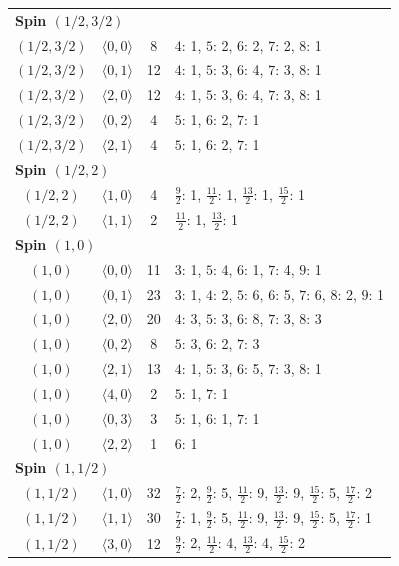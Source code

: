 \begin{longtable}{c c c p{8.8cm}}
\midrule
\multicolumn{4}{l}{\textbf{Spin $(1/2,3/2)$}}\\
$(1/2,3/2)$ & $\langle 0,0\rangle$ & 8 & $4$: 1, $5$: 2, $6$: 2, $7$: 2, $8$: 1 \\
$(1/2,3/2)$ & $\langle 0,1\rangle$ & 12 & $4$: 1, $5$: 3, $6$: 4, $7$: 3, $8$: 1 \\
$(1/2,3/2)$ & $\langle 2,0\rangle$ & 12 & $4$: 1, $5$: 3, $6$: 4, $7$: 3, $8$: 1 \\
$(1/2,3/2)$ & $\langle 0,2\rangle$ & 4 & $5$: 1, $6$: 2, $7$: 1 \\
$(1/2,3/2)$ & $\langle 2,1\rangle$ & 4 & $5$: 1, $6$: 2, $7$: 1 \\
\midrule
\multicolumn{4}{l}{\textbf{Spin $(1/2,2)$}}\\
$(1/2,2)$ & $\langle 1,0\rangle$ & 4 & $\frac{9}{2}$: 1, $\frac{11}{2}$: 1, $\frac{13}{2}$: 1, $\frac{15}{2}$: 1 \\
$(1/2,2)$ & $\langle 1,1\rangle$ & 2 & $\frac{11}{2}$: 1, $\frac{13}{2}$: 1 \\
\midrule
\multicolumn{4}{l}{\textbf{Spin $(1,0)$}}\\
$(1,0)$ & $\langle 0,0\rangle$ & 11 & $3$: 1, $5$: 4, $6$: 1, $7$: 4, $9$: 1 \\
$(1,0)$ & $\langle 0,1\rangle$ & 23 & $3$: 1, $4$: 2, $5$: 6, $6$: 5, $7$: 6, $8$: 2, $9$: 1 \\
$(1,0)$ & $\langle 2,0\rangle$ & 20 & $4$: 3, $5$: 3, $6$: 8, $7$: 3, $8$: 3 \\
$(1,0)$ & $\langle 0,2\rangle$ & 8 & $5$: 3, $6$: 2, $7$: 3 \\
$(1,0)$ & $\langle 2,1\rangle$ & 13 & $4$: 1, $5$: 3, $6$: 5, $7$: 3, $8$: 1 \\
$(1,0)$ & $\langle 4,0\rangle$ & 2 & $5$: 1, $7$: 1 \\
$(1,0)$ & $\langle 0,3\rangle$ & 3 & $5$: 1, $6$: 1, $7$: 1 \\
$(1,0)$ & $\langle 2,2\rangle$ & 1 & $6$: 1 \\
\midrule
\multicolumn{4}{l}{\textbf{Spin $(1,1/2)$}}\\
$(1,1/2)$ & $\langle 1,0\rangle$ & 32 & $\frac{7}{2}$: 2, $\frac{9}{2}$: 5, $\frac{11}{2}$: 9, $\frac{13}{2}$: 9, $\frac{15}{2}$: 5, $\frac{17}{2}$: 2 \\
$(1,1/2)$ & $\langle 1,1\rangle$ & 30 & $\frac{7}{2}$: 1, $\frac{9}{2}$: 5, $\frac{11}{2}$: 9, $\frac{13}{2}$: 9, $\frac{15}{2}$: 5, $\frac{17}{2}$: 1 \\
$(1,1/2)$ & $\langle 3,0\rangle$ & 12 & $\frac{9}{2}$: 2, $\frac{11}{2}$: 4, $\frac{13}{2}$: 4, $\frac{15}{2}$: 2 \\

\end{longtable}
